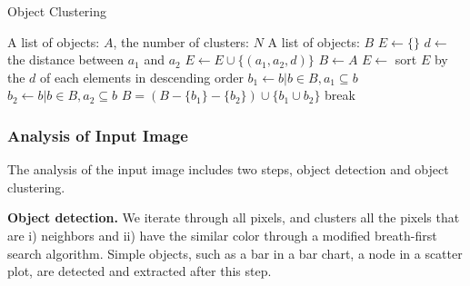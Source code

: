     \begin{algorithm}  
        \caption{Object Clustering} 
        \label{alg:alg2} 
        \begin{algorithmic} %
            \Require A list of objects: $A$, the number of clusters: $N$
            \Ensure A list of objects: $B$
            \State $E \gets \{\}$
                 
                        \State $d \gets$ the distance between $a_1$ and $a_2$
                        \State $E \gets E \cup \{(a_1, a_2, d)\}$
                    \EndIf
                \EndFor
            \EndFor
            \State $B \gets A$
            \State $E \gets$ sort $E$ by the $d$ of each elements in descending order
                \State $b_1 \gets b|b\in B, a_1 \subseteq b$
                \State $b_2 \gets b|b\in B, a_2 \subseteq b$
                    \State $B = (B - \{b_1\} - \{b_2\})\cup \{b_1 \cup b_2\}$
                \EndIf
                    \State break
                \EndIf
            \EndFor
            \State {}
        \end{algorithmic}  
    \end{algorithm} 
    
\subsubsection{Analysis of Input Image}
The analysis of the input image includes two steps, object detection and object clustering.

\noindent
\textbf{Object detection.} We iterate through all pixels, and clusters all the pixels that are i) neighbors and ii) have the similar color through a modified breath-first search algorithm. Simple objects, such as a bar in a bar chart, a node in a scatter plot, are detected and extracted after this step.

